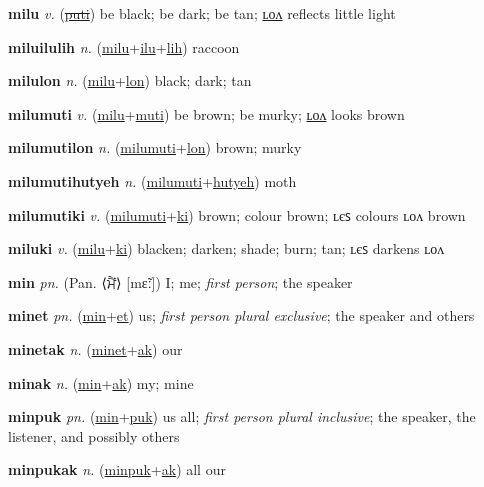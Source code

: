\textbf{\hypertarget{milu}{milu}} \textit{v.} (\hyperlink{puti}{\sout{puti}})
be black; be dark; be tan; \hyperlink{milulon}{ʟᴏᴧ} reflects little light

\textbf{\hypertarget{miluilulih}{miluilulih}} \textit{n.} (\hyperlink{milu}{milu}+\allowbreak \hyperlink{ilu}{ilu}+\allowbreak \hyperlink{lih}{lih})
raccoon

\textbf{\hypertarget{milulon}{milulon}} \textit{n.} (\hyperlink{milu}{milu}+\allowbreak \hyperlink{lon}{lon})
black; dark; tan

\textbf{\hypertarget{milumuti}{milumuti}} \textit{v.} (\hyperlink{milu}{milu}+\allowbreak \hyperlink{muti}{muti})
be brown; be murky; \hyperlink{milumutilon}{ʟᴏᴧ} looks brown

\textbf{\hypertarget{milumutilon}{milumutilon}} \textit{n.} (\hyperlink{milumuti}{milumuti}+\allowbreak \hyperlink{lon}{lon})
brown; murky

\textbf{\hypertarget{milumutihutyeh}{milumutihutyeh}} \textit{n.} (\hyperlink{milumuti}{milumuti}+\allowbreak \hyperlink{hutyeh}{hutyeh})
moth

\textbf{\hypertarget{milumutiki}{milumutiki}} \textit{v.} (\hyperlink{milumuti}{milumuti}+\allowbreak \hyperlink{ki}{ki})
brown; colour brown; ʟєꜱ colours ʟᴏᴧ brown

\textbf{\hypertarget{miluki}{miluki}} \textit{v.} (\hyperlink{milu}{milu}+\allowbreak \hyperlink{ki}{ki})
blacken; darken; shade; burn; tan; ʟєꜱ darkens ʟᴏᴧ

\textbf{\hypertarget{min}{min}} \textit{pn.} (Pan. ⟨{\gurmukhi{}ਮੈਂ}⟩ [mɛ̃ː])
I; me; \textit{first person}; the speaker

\textbf{\hypertarget{minet}{minet}} \textit{pn.} (\hyperlink{min}{min}+\allowbreak \hyperlink{et}{et})
us; \textit{first person plural exclusive}; the speaker and others

\textbf{\hypertarget{minetak}{minetak}} \textit{n.} (\hyperlink{minet}{minet}+\allowbreak \hyperlink{ak}{ak})
our

\textbf{\hypertarget{minak}{minak}} \textit{n.} (\hyperlink{min}{min}+\allowbreak \hyperlink{ak}{ak})
my; mine

\textbf{\hypertarget{minpuk}{minpuk}} \textit{pn.} (\hyperlink{min}{min}+\allowbreak \hyperlink{puk}{puk})
us all; \textit{first person plural inclusive}; the speaker, the listener, and possibly others

\textbf{\hypertarget{minpukak}{minpukak}} \textit{n.} (\hyperlink{minpuk}{minpuk}+\allowbreak \hyperlink{ak}{ak})
all our

